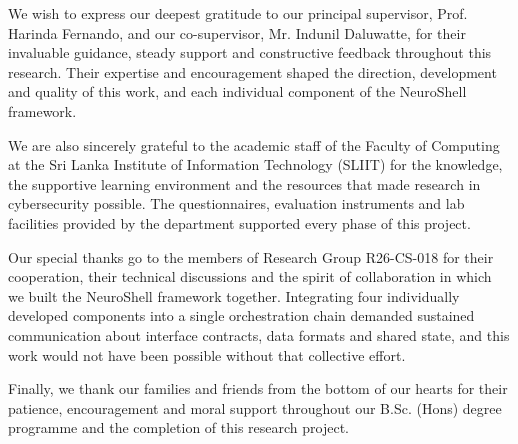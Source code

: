 We wish to express our deepest gratitude to our principal supervisor, Prof.
Harinda Fernando, and our co-supervisor, Mr. Indunil Daluwatte, for their
invaluable guidance, steady support and constructive feedback throughout this
research. Their expertise and encouragement shaped the direction, development
and quality of this work, and each individual component of the NeuroShell
framework.

We are also sincerely grateful to the academic staff of the Faculty of Computing
at the Sri Lanka Institute of Information Technology (SLIIT) for the knowledge,
the supportive learning environment and the resources that made research in
cybersecurity possible. The questionnaires, evaluation instruments and lab
facilities provided by the department supported every phase of this project.

Our special thanks go to the members of Research Group R26-CS-018 for their
cooperation, their technical discussions and the spirit of collaboration in
which we built the NeuroShell framework together. Integrating four individually
developed components into a single orchestration chain demanded sustained
communication about interface contracts, data formats and shared state, and this
work would not have been possible without that collective effort.

Finally, we thank our families and friends from the bottom of our hearts for
their patience, encouragement and moral support throughout our B.Sc. (Hons)
degree programme and the completion of this research project.